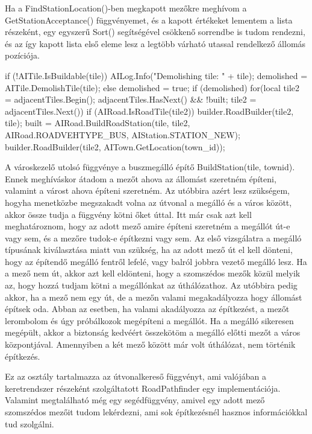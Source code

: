 Ha a FindStationLocation()-ben megkapott mezőkre meghívom a GetStationAcceptance() függvényemet, és a kapott értékeket lementem a lista részeként, egy egyszerű Sort() segítségével csökkenő sorrendbe is tudom rendezni, és az így kapott lista első eleme lesz a legtöbb várható utassal rendelkező állomás pozíciója.

\begin{cpp}
if (!AITile.IsBuildable(tile)) {
  AILog.Info("Demolishing tile: " + tile);
  demolished = AITile.DemolishTile(tile);
} else {
  demolished = true;
}
if (demolished) {
  for(local tile2 = adjacentTiles.Begin(); 
   adjacentTiles.HasNext() && !built; tile2 = adjacentTiles.Next()) {
	if (AIRoad.IsRoadTile(tile2)) {
      builder.RoadBuilder(tile2, tile);
      built = AIRoad.BuildRoadStation(tile, tile2,
      AIRoad.ROADVEHTYPE_BUS, AIStation.STATION_NEW);
      builder.RoadBuilder(tile2, AITown.GetLocation(town_id));
    }
  }
}
\end{cpp}

A városkezelő utolsó függvénye a buszmegálló építő BuildStation(tile, townid). Ennek meghíváskor átadom a mezőt ahova az állomást szeretném építeni, valamint a várost ahova építeni szeretném. Az utóbbira azért lesz szükségem, hogyha menetközbe megszakadt volna az útvonal a megálló és a város között, akkor össze tudja a függvény kötni őket úttal. Itt már csak azt kell meghatároznom, hogy az adott mező amire építeni szeretném a megállót út-e vagy sem, és a mezőre tudok-e építkezni vagy sem. Az első vizsgálatra a megálló típusának kiválasztása miatt van szükség, ha az adott mező út el kell dönteni, hogy az építendő megálló fentről lefelé, vagy balról jobbra vezető megálló lesz. Ha a mező nem út, akkor azt kell eldönteni, hogy a szomszédos mezők közül melyik az, hogy hozzá tudjam kötni a megállónkat az úthálózathoz. Az utóbbira pedig akkor, ha a mező nem egy út, de a mezőn valami megakadályozza hogy állomást építsek oda. Abban az esetben, ha valami akadályozza az építkezést, a mezőt lerombolom és úgy próbálkozok megépíteni a megállót. Ha a megálló sikeresen megépült, akkor a biztonság kedvéért összekötöm a megálló előtti mezőt a város központjával. Amennyiben a két mező között már volt úthálózat, nem történik építkezés.


Ez az osztály tartalmazza az útvonalkereső függvényt, ami valójában a keretrendszer részeként szolgáltatott RoadPathfinder egy implementációja. Valamint megtalálható még egy segédfüggvény, amivel egy adott mező szomszédos mezőit tudom lekérdezni, ami sok építkezésnél hasznos információkkal tud szolgálni.

